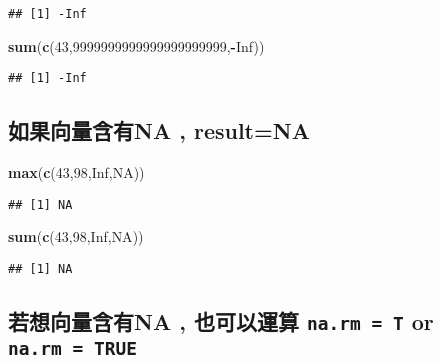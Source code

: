 \documentclass[]{article}
\newenvironment{Shaded}{\begin{snugshade}}{\end{snugshade}}
\newcommand{\DecValTok}[1]{\textcolor[rgb]{0.00,0.00,0.81}{#1}}
\newcommand{\KeywordTok}[1]{\textcolor[rgb]{0.13,0.29,0.53}{\textbf{#1}}}
\newcommand{\NormalTok}[1]{#1}
\newcommand{\OperatorTok}[1]{\textcolor[rgb]{0.81,0.36,0.00}{\textbf{#1}}}
\newcommand{\OtherTok}[1]{\textcolor[rgb]{0.56,0.35,0.01}{#1}}
\begin{document}
\begin{verbatim}
## [1] -Inf
\end{verbatim}

\begin{Shaded}
\begin{Highlighting}[]
\KeywordTok{sum}\NormalTok{(}\KeywordTok{c}\NormalTok{(}\DecValTok{43}\NormalTok{,}\DecValTok{9999999999999999999999}\NormalTok{,}\OperatorTok{-}\OtherTok{Inf}\NormalTok{))}
\end{Highlighting}
\end{Shaded}

\begin{verbatim}
## [1] -Inf
\end{verbatim}

\hypertarget{ux5982ux679cux5411ux91cfux542bux6709na-resultna}{%
\subsection{如果向量含有NA ,
result=NA}\label{ux5982ux679cux5411ux91cfux542bux6709na-resultna}}

\begin{Shaded}
\begin{Highlighting}[]
\KeywordTok{max}\NormalTok{(}\KeywordTok{c}\NormalTok{(}\DecValTok{43}\NormalTok{,}\DecValTok{98}\NormalTok{,}\OtherTok{Inf}\NormalTok{,}\OtherTok{NA}\NormalTok{))}
\end{Highlighting}
\end{Shaded}

\begin{verbatim}
## [1] NA
\end{verbatim}

\begin{Shaded}
\begin{Highlighting}[]
\KeywordTok{sum}\NormalTok{(}\KeywordTok{c}\NormalTok{(}\DecValTok{43}\NormalTok{,}\DecValTok{98}\NormalTok{,}\OtherTok{Inf}\NormalTok{,}\OtherTok{NA}\NormalTok{))}
\end{Highlighting}
\end{Shaded}

\begin{verbatim}
## [1] NA
\end{verbatim}

\hypertarget{ux82e5ux60f3ux5411ux91cfux542bux6709na-ux4e5fux53efux4ee5ux904bux7b97-na.rm-t-or-na.rm-true}{%
\subsection{\texorpdfstring{若想向量含有NA , 也可以運算
\texttt{na.rm\ =\ T} or
\texttt{na.rm\ =\ TRUE}}{若想向量含有NA , 也可以運算 na.rm = T or na.rm = TRUE}}\label{ux82e5ux60f3ux5411ux91cfux542bux6709na-ux4e5fux53efux4ee5ux904bux7b97-na.rm-t-or-na.rm-true}}
\end{document}
